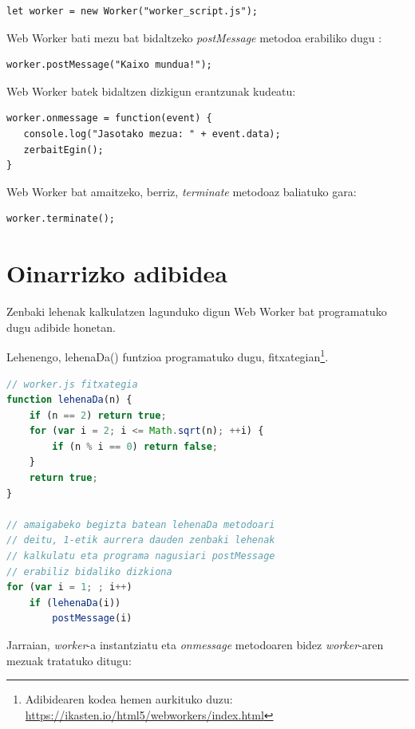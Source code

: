 \begin{lstlisting}[numbers=none]
let worker = new Worker("worker_script.js");
\end{lstlisting}

Web Worker bati mezu bat bidaltzeko \textit{postMessage} metodoa erabiliko dugu :
\begin{lstlisting}[numbers=none]
worker.postMessage("Kaixo mundua!");
\end{lstlisting}

Web Worker batek bidaltzen dizkigun erantzunak kudeatu:


\begin{lstlisting}[numbers=none]
worker.onmessage = function(event) {
   console.log("Jasotako mezua: " + event.data);
   zerbaitEgin();
}
\end{lstlisting}


Web Worker bat amaitzeko, berriz, \textit{terminate} metodoaz baliatuko gara:

\begin{lstlisting}[numbers=none]
worker.terminate();
\end{lstlisting}


\section{Oinarrizko adibidea}

Zenbaki lehenak kalkulatzen lagunduko digun Web Worker bat programatuko dugu adibide honetan.

Lehenengo, lehenaDa() funtzioa programatuko dugu,  fitxategian\footnote{
Adibidearen kodea hemen aurkituko duzu: \href{https://ikasten.io/html5/webworkers/index.html}{https://ikasten.io/html5/webworkers/index.html}}.

\begin{lstlisting}[numbers=none,language=JavaScript]
// worker.js fitxategia
function lehenaDa(n) {
    if (n == 2) return true;
    for (var i = 2; i <= Math.sqrt(n); ++i) {
        if (n % i == 0) return false;
    }
    return true;
}

// amaigabeko begizta batean lehenaDa metodoari
// deitu, 1-etik aurrera dauden zenbaki lehenak
// kalkulatu eta programa nagusiari postMessage 
// erabiliz bidaliko dizkiona
for (var i = 1; ; i++)
    if (lehenaDa(i))
        postMessage(i)
\end{lstlisting}

Jarraian, \textit{worker}-a instantziatu eta \textit{onmessage} metodoaren bidez \textit{worker}-aren mezuak tratatuko ditugu:

